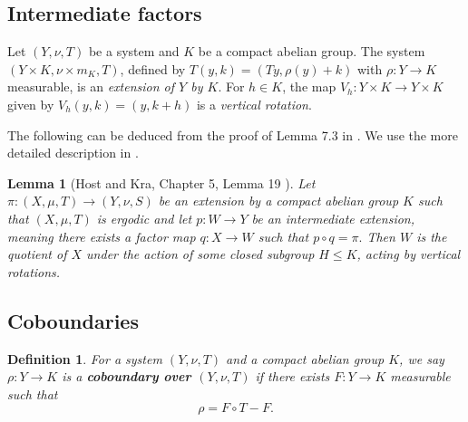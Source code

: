 \documentclass[12pt]{amsart}
\theoremstyle{definition}
\theoremstyle{plain}
\newtheorem{lemma}[theorem]{Lemma}
\newtheorem{definition}[theorem]{Definition}
\theoremstyle{definition}
\numberwithin{equation}{section}
\begin{document}
\subsection{Intermediate factors} 

Let $(Y,\nu,T)$ be a system and $K$ be a compact abelian group. The system $(Y\times K,\nu \times m_K, T)$, defined by $T(y,k)=(Ty,\rho(y)+k)$ with $\rho\colon Y \rightarrow K$ measurable, is an \textit{extension of $Y$ by $K$}. For $h \in K$, the map $V_h\colon Y \times K \rightarrow Y \times K$ given by $V_h(y,k)=(y,k+h)$ is a \textit{vertical rotation}. 

The following can be deduced from the proof of Lemma 7.3 in \cite{Furstenberg and Weiss}. We use the more detailed description in \cite{HK2}.


\begin{lemma}[Host and Kra, Chapter 5, Lemma 19 \cite{HK2}] \label{intermediate extensions}
   Let $\pi\colon (X,\mu,T) \rightarrow (Y,\nu,S)$ be an extension by a compact abelian group $K$ such that $(X,\mu,T)$ is ergodic and let $p\colon W \rightarrow Y$ be an intermediate extension, meaning there exists a factor map $q\colon X \rightarrow W$ such that $p\circ q=\pi.$ Then $W$ is the quotient of $X$ under the action of some closed subgroup $H \leq K$, acting by vertical rotations.
\end{lemma}



\subsection{Coboundaries}
\begin{definition}\label{def of cob}
    For a system $(Y,\nu,T)$ and a compact abelian group $K$, we say $\rho\colon Y \rightarrow K$ is a \textbf{coboundary over $(Y,\nu,T)$} if there exists $ F\colon Y \rightarrow K$ measurable such that 
    \begin{equation} \label{eq:coboundary}
        \rho=F \circ T - F.
    \end{equation}
\end{definition}
\end{document}
